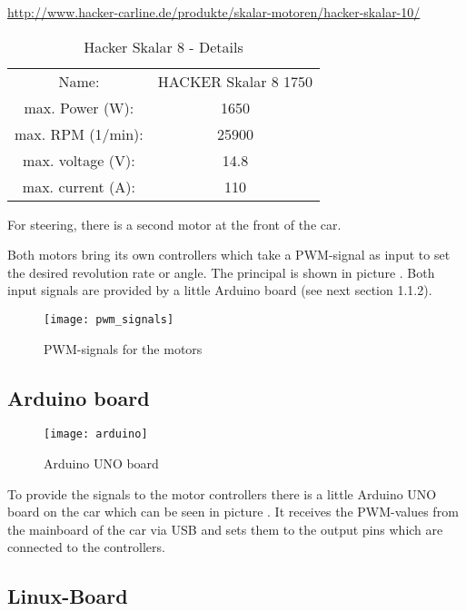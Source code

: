 \hyperref[http://www.hacker-carline.de/produkte/skalar-motoren/hacker-skalar-10/]{http://www.hacker-carline.de/produkte/skalar-motoren/hacker-skalar-10/}

\begin{table}[b]
	\centering	
	\begin{tabular}{cc} %
		\hline 
		Name: & HACKER Skalar 8 1750 \\
		max. Power (W): & 1650 \\
		max. RPM (1/min): & 25900 \\
		max. voltage (V): & 14.8 \\
		max. current (A): & 110 \\
		\hline
	\end{tabular}
	\caption{Hacker Skalar 8 - Details} %
	\label{tab:motor_details}
\end{table}


For steering, there is a second motor at the front of the car.

Both motors bring its own controllers which take a PWM-signal as input to set the desired revolution rate or angle. The principal is shown in picture . Both input signals are provided by a little Arduino board (see next section 1.1.2).

\begin{figure}[h]
	\centering
		\texttt{[image: pwm\_signals]}
	\caption{PWM-signals for the motors}
	\label{fig:pwm_signals}
\end{figure}


\subsection{Arduino board}
\label{sec:overview_arduino}
\begin{figure}[h]
	\centering
		\texttt{[image: arduino]}
	\caption{Arduino UNO board}
	\label{fig:arduino}
\end{figure}

To provide the signals to the motor controllers there is a little Arduino UNO board on the car which can be seen in picture . It receives the PWM-values from the mainboard of the car via USB and sets them to the output pins which are connected to the controllers.

\subsection{Linux-Board}
\label{sec:overview_board}

